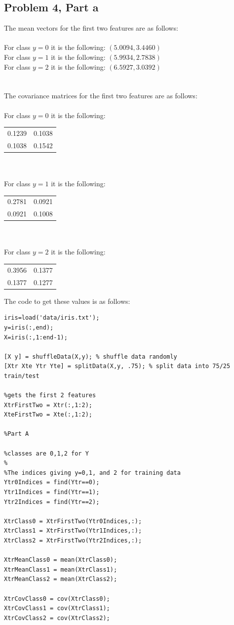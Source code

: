 \documentclass[11pt,psfig]{article}
\begin{document}
\subsection*{Problem 4, Part a}
The mean vectors for the first two features are as follows:\\
\\
For class $y=0$ it is the following: $(5.0094,3.4460)$\\
For class $y=1$ it is the following: $(5.9934,2.7838)$\\
For class $y=2$ it is the following: $(6.5927,3.0392)$\\
\\
\\
The covariance matrices for the first two features are as follows:\\
\\
For class $y=0$ it is the following:\\
\begin{tabular}{l c}
0.1239 & 0.1038\\
0.1038 & 0.1542\\
\end{tabular}
\\
\\
For class $y=1$ it is the following:\\
\begin{tabular}{l c}
0.2781 & 0.0921\\
0.0921 & 0.1008\\
\end{tabular}
\\
\\
For class $y=2$ it is the following:\\
\begin{tabular}{l c}
0.3956 & 0.1377\\
0.1377 & 0.1277\\
\end{tabular}

\newpage

The code to get these values is as follows:
\begin{verbatim}
iris=load('data/iris.txt'); 
y=iris(:,end); 
X=iris(:,1:end-1);

[X y] = shuffleData(X,y); % shuffle data randomly
[Xtr Xte Ytr Yte] = splitData(X,y, .75); % split data into 75/25 train/test

%gets the first 2 features
XtrFirstTwo = Xtr(:,1:2);
XteFirstTwo = Xte(:,1:2);

%Part A

%classes are 0,1,2 for Y
%
%The indices giving y=0,1, and 2 for training data
Ytr0Indices = find(Ytr==0);
Ytr1Indices = find(Ytr==1);
Ytr2Indices = find(Ytr==2);

XtrClass0 = XtrFirstTwo(Ytr0Indices,:);
XtrClass1 = XtrFirstTwo(Ytr1Indices,:);
XtrClass2 = XtrFirstTwo(Ytr2Indices,:);

XtrMeanClass0 = mean(XtrClass0);
XtrMeanClass1 = mean(XtrClass1);
XtrMeanClass2 = mean(XtrClass2);

XtrCovClass0 = cov(XtrClass0);
XtrCovClass1 = cov(XtrClass1);
XtrCovClass2 = cov(XtrClass2);
\end{verbatim}
\end{document}
